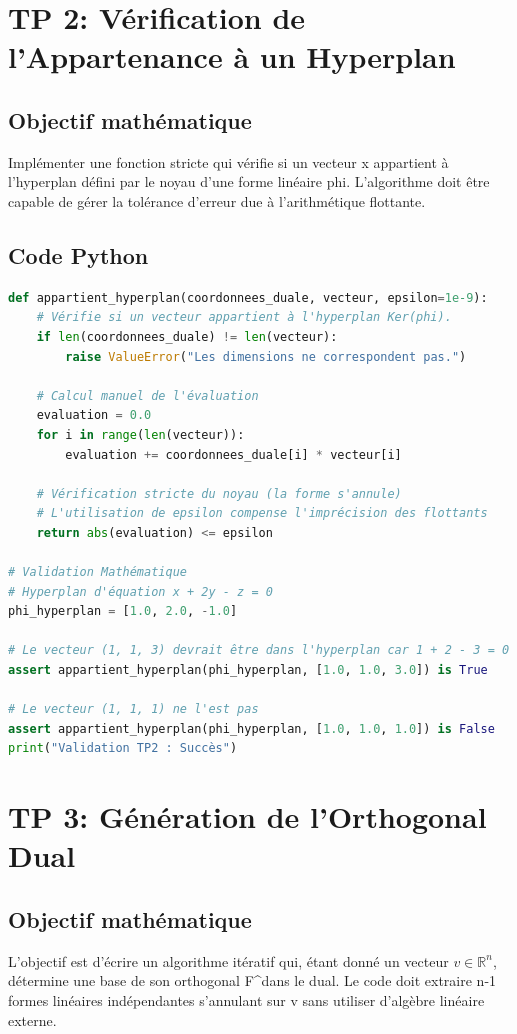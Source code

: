 \documentclass{report}
\begin{document}
\newpage
\chapter*{TP 2: Vérification de l'Appartenance à un Hyperplan}

\section*{Objectif mathématique}
Implémenter une fonction stricte qui vérifie si un vecteur x appartient à l'hyperplan défini par le noyau d'une forme linéaire phi. L'algorithme doit être capable de gérer la tolérance d'erreur due à l'arithmétique flottante.

\section*{Code Python}
\begin{lstlisting}[language=Python]
def appartient_hyperplan(coordonnees_duale, vecteur, epsilon=1e-9):
    # Vérifie si un vecteur appartient à l'hyperplan Ker(phi).
    if len(coordonnees_duale) != len(vecteur):
        raise ValueError("Les dimensions ne correspondent pas.")

    # Calcul manuel de l'évaluation
    evaluation = 0.0
    for i in range(len(vecteur)):
        evaluation += coordonnees_duale[i] * vecteur[i]

    # Vérification stricte du noyau (la forme s'annule)
    # L'utilisation de epsilon compense l'imprécision des flottants
    return abs(evaluation) <= epsilon

# Validation Mathématique
# Hyperplan d'équation x + 2y - z = 0
phi_hyperplan = [1.0, 2.0, -1.0]

# Le vecteur (1, 1, 3) devrait être dans l'hyperplan car 1 + 2 - 3 = 0
assert appartient_hyperplan(phi_hyperplan, [1.0, 1.0, 3.0]) is True

# Le vecteur (1, 1, 1) ne l'est pas
assert appartient_hyperplan(phi_hyperplan, [1.0, 1.0, 1.0]) is False
print("Validation TP2 : Succès")

\end{lstlisting}

\newpage
\chapter*{TP 3: Génération de l'Orthogonal Dual}

\section*{Objectif mathématique}
L'objectif est d'écrire un algorithme itératif qui, étant donné un vecteur $v \in \mathbb{R}^n$, détermine une base de son orthogonal F^\circ dans le dual. Le code doit extraire n-1 formes linéaires indépendantes s'annulant sur v sans utiliser d'algèbre linéaire externe.
\end{document}
